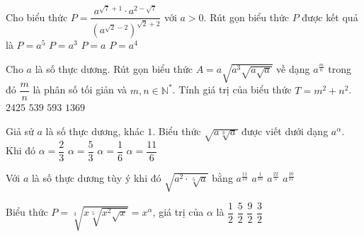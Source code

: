 \begin{ex}%
	 Cho biểu thức $P=\dfrac{a^{\sqrt{7}+1}\cdot a^{2-\sqrt{7}}}{\left(a^{\sqrt{2}-2}\right)^{\sqrt{2}+2}}$ với $a>0$. Rút gọn biểu thức $P$ được kết quả là
	\choice 
		 {\True $P=a^5$}
		 {$P=a^3$}
		{$P=a$} 
		{$P=a^4$} 
\end{ex}

\begin{ex}%
	Cho $a$ là số thực  dương. Rút gọn biểu thức $A=a\sqrt{a^3\sqrt{a\sqrt{a}}}$ về dạng $a^{\tfrac{m}{n}}$ trong đó $\dfrac{m}{n}$ là phân số tối giản và $m,n\in{\mathbb{N}^{*}}$. Tính giá trị của biểu thức $T=m^2+n^2$.
	 \choice
		{$2425$} 
		 {$539$}
		{\True  $593$}
		{$1369$} 
\end{ex}

\begin{ex}%
	Giả sử $a$ là  số thực dương, khác $1$. Biểu thức $\sqrt{a\sqrt[3]{a}}$ được viết dưới dạng $a^{\alpha}$. Khi đó
	\choice 
		{\True  $\alpha =\dfrac{2}{3}$}
		{$\alpha  =\dfrac{5}{3}$}
		 {$\alpha =\dfrac{1}{6}$}
		{$\alpha =\dfrac{11}{6}$} 
\end{ex}

\begin{ex}%
	Với $a$ là số thực dương tùy ý khi đó  $\sqrt{a^2\cdot \sqrt[5]{a}}$ bằng
	 \choice
		{\True $a^{\tfrac{11}{10}}$} 
		{$a^{\tfrac{1}{10}}$} 
		{$a^{\tfrac{22}{5}}$} 
		 {$a^{\tfrac{10}{11}}$}
\end{ex}

\begin{ex}%
	Biểu thức $P = \sqrt[3]{x\sqrt[5]{x^2\sqrt{x}}}  = x^{\alpha}
	$, giá trị của  $\alpha $ là
	\choice 
		{\True $\dfrac{1}{2}$} 
		 {$\dfrac{5}{2}$}
		 {$\dfrac{9}{2}$}
		 {$\dfrac{3}{2}$}
\end{ex}

